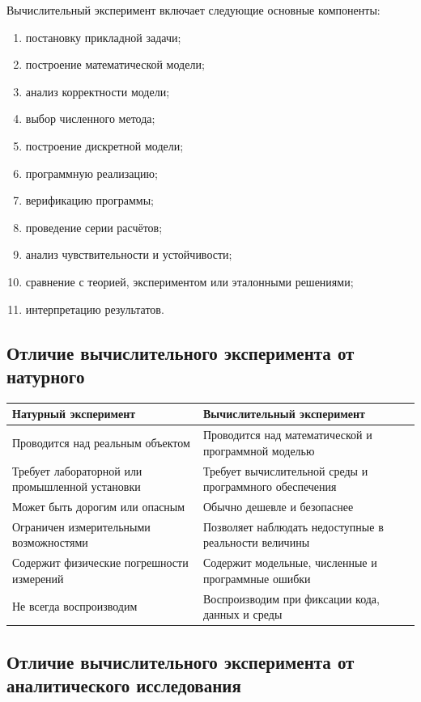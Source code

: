 \documentclass[12pt,a4paper]{article}
\theoremstyle{definition}
\theoremstyle{plain}
\begin{document}
Вычислительный эксперимент включает следующие основные компоненты:
\begin{enumerate}
    \item постановку прикладной задачи;
    \item построение математической модели;
    \item анализ корректности модели;
    \item выбор численного метода;
    \item построение дискретной модели;
    \item программную реализацию;
    \item верификацию программы;
    \item проведение серии расчётов;
    \item анализ чувствительности и устойчивости;
    \item сравнение с теорией, экспериментом или эталонными решениями;
    \item интерпретацию результатов.
\end{enumerate}

\subsection{Отличие вычислительного эксперимента от натурного}

\begin{center}
\begin{tabular}{p{} p{}}
\toprule
\textbf{Натурный эксперимент} & \textbf{Вычислительный эксперимент} \\
\midrule
Проводится над реальным объектом & Проводится над математической и программной моделью \\
Требует лабораторной или промышленной установки & Требует вычислительной среды и программного обеспечения \\
Может быть дорогим или опасным & Обычно дешевле и безопаснее \\
Ограничен измерительными возможностями & Позволяет наблюдать недоступные в реальности величины \\
Содержит физические погрешности измерений & Содержит модельные, численные и программные ошибки \\
Не всегда воспроизводим & Воспроизводим при фиксации кода, данных и среды \\
\bottomrule
\end{tabular}
\end{center}

\subsection{Отличие вычислительного эксперимента от аналитического исследования}
\end{document}
